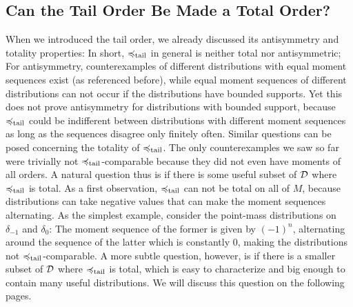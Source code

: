 \documentclass[a4paper]{scrreprt}
\newcommand{\M}{M}
\theoremstyle{definition}
\begin{document}
    \subsection{Can the Tail Order Be Made a Total Order?}
    \label{subsec:tailOrderTotality}
    When we introduced the tail order, we already discussed its antisymmetry and totality properties: In short, $\preccurlyeq_{\text{tail}}$ in general is neither total nor antisymmetric; For antisymmetry, counterexamples of different distributions with equal moment sequences exist (as referenced before), while equal moment sequences of different distributions can not occur if the distributions have bounded supports. Yet this does not prove antisymmetry for distributions with bounded support, because $\preccurlyeq_{\text{tail}}$ could be indifferent between distributions with different moment sequences as long as the sequences disagree only finitely often.
    Similar questions can be posed concerning the totality of $\preccurlyeq_{\text{tail}}$. The only counterexamples we saw so far were trivially not $\preccurlyeq_{\text{tail}}$-comparable because they did not even have moments of all orders.
    A natural question thus is if there is some useful subset of $\mathcal{D}$ where $\preccurlyeq_{\text{tail}}$ is total. As a first observation, $\preccurlyeq_{\text{tail}}$ can not be total on all of $\M$, because distributions can take negative values that can make the moment sequences alternating. 
    As the simplest example, consider the point-mass distributions on $\delta_{-1}$ and $\delta_{0}$: The moment sequence of the former is given by $(-1)^n$, alternating around the sequence of the latter which is constantly $0$, making the distributions not $\preccurlyeq_{\text{tail}}$-comparable.
    A more subtle question, however, is if there is a smaller subset of $\mathcal{D}$ where $\preccurlyeq_{\text{tail}}$ is total, which is easy to characterize and big enough to contain many useful distributions. We will discuss this question on the following pages.
    
\end{document}
